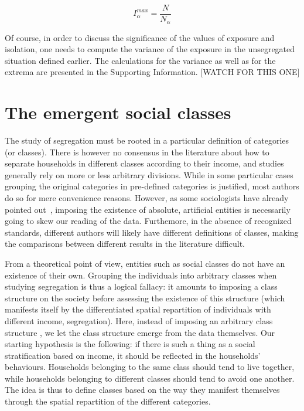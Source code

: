 \begin{equation}
    I_\alpha^{max} = \frac{N}{N_\alpha}
\end{equation}

Of course, in order to discuss the significance of the values of exposure and
isolation, one needs to compute the variance of the exposure in the unsegregated
situation defined earlier. The calculations for the variance as well as for the
extrema are presented in the Supporting Information. [WATCH FOR THIS ONE]

\section{The emergent social classes}
\label{sec:the_emergent_social_classes}

The study of segregation must be rooted in a particular definition of categories
(or classes). There is however no consensus in the literature about how to
separate households in different classes according to their income, and studies
generally rely on more or less arbitrary divisions. While in some particular
cases grouping the original categories in pre-defined categories is justified,
most authors do so for mere convenience reasons. However, as some sociologists
have already pointed out~\cite{Emirbayer:1997}, imposing the existence of
absolute, artificial entities is necessarily going to skew our reading of the
data. Furthemore, in the absence of recognized standards, different authors will
likely have different definitions of classes, making the comparisons between
different results in the literature difficult. 

From a theoretical point of view, entities such as social classes do not have an
existence of their own. Grouping the individuals into arbitrary classes when
studying segregation is thus a logical fallacy: it amounts to imposing a class
structure on the society before assessing the existence of this structure (which
manifests itself by the differentiated spatial repartition of individuals with
different income, segregation). Here, instead of imposing an arbitrary class
structure , we let the class structure emerge from the data themselves. Our
starting hypothesis is the following: if there is such a thing as a social
stratification based on income, it should be reflected in the households'
behaviours. Households belonging to the same class should tend to live together,
while households belonging to different classes should tend to avoid one
another. The idea is thus to define classes based on the way they manifest
themselves through the spatial repartition of the different categories. 

